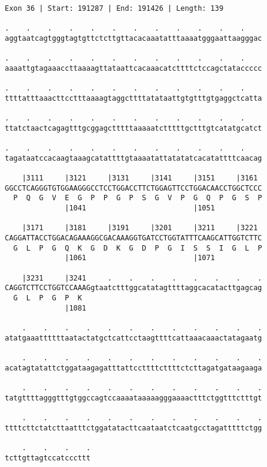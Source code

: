 \documentclass{article}
\begin{document}
\begin{Verbatim}
Exon 36 | Start: 191287 | End: 191426 | Length: 139
 
.    .    .    .    .    .    .    .    .    .    .    .    
aggtaatcagtgggtagtgttctcttgttacacaaatatttaaaatgggaattaagggac
  
.    .    .    .    .    .    .    .    .    .    .    .    
aaaattgtagaaaccttaaaagttataattcacaaacatcttttctccagctataccccc
  
.    .    .    .    .    .    .    .    .    .    .    .    
ttttatttaaacttcctttaaaagtaggcttttatataattgtgtttgtgaggctcatta
  
.    .    .    .    .    .    .    .    .    .    .    .    
ttatctaactcagagtttgcggagctttttaaaaatctttttgctttgtcatatgcatct
  
.    .    .    .    .    .    .    .    .    .    .    .    
tagataatccacaagtaaagcatattttgtaaaatattatatatcacatattttcaacag
  
    |3111     |3121     |3131     |3141     |3151     |3161 
GGCCTCAGGGTGTGGAAGGGCCTCCTGGACCTTCTGGAGTTCCTGGACAACCTGGCTCCC
  P  Q  G  V  E  G  P  P  G  P  S  G  V  P  G  Q  P  G  S  P
              |1041                         |1051           
  
    |3171     |3181     |3191     |3201     |3211     |3221 
CAGGATTACCTGGACAGAAAGGCGACAAAGGTGATCCTGGTATTTCAAGCATTGGTCTTC
  G  L  P  G  Q  K  G  D  K  G  D  P  G  I  S  S  I  G  L  P
              |1061                         |1071           
  
    |3231     |3241     .    .    .    .    .    .    .    .
CAGGTCTTCCTGGTCCAAAGgtaatctttggcatatagttttaggcacatacttgagcag
  G  L  P  G  P  K                                          
              |1081                                         
  
    .    .    .    .    .    .    .    .    .    .    .    .
atatgaaattttttaatactatgctcattcctaagttttcattaaacaaactatagaatg
  
    .    .    .    .    .    .    .    .    .    .    .    .
acatagtatattctggataagagatttattccttttcttttctcttagatgataagaaga
  
    .    .    .    .    .    .    .    .    .    .    .    .
tatgttttagggtttgtggccagtccaaaataaaaagggaaaactttctggtttctttgt
  
    .    .    .    .    .    .    .    .    .    .    .    .
ttttcttctatcttaatttctggatatacttcaataatctcaatgcctagatttttctgg
  
    .    .    .    .
tcttgttagtccatcccttt
\end{Verbatim}
\newpage
\end{document}
